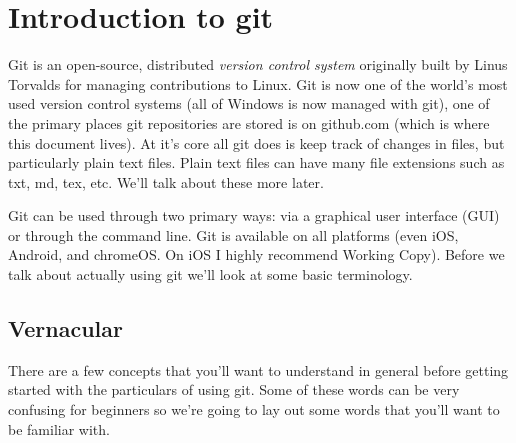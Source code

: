 \section{Introduction to git}

Git is an open-source, distributed \textit{version control system} originally built by Linus Torvalds for managing contributions to Linux. Git is now one of the world's most used version control systems (all of Windows is now managed with git), one of the primary places git repositories are stored is on github.com (which is where this document lives). At it's core all git does is keep track of changes in files, but particularly plain text files. Plain text files can have many file extensions such as txt, md, tex, etc. We'll talk about these more later.

Git can be used through two primary ways: via a graphical user interface (GUI) or through the command line. Git is available on all platforms (even iOS, Android, and chromeOS. On iOS I highly recommend Working Copy). Before we talk about actually using git we'll look at some basic terminology.


\subsection{Vernacular}

There are a few concepts that you'll want to understand in general before getting started with the particulars of using git. Some of these words can be very confusing for beginners so we're going to lay out some words that you'll want to be familiar with.

